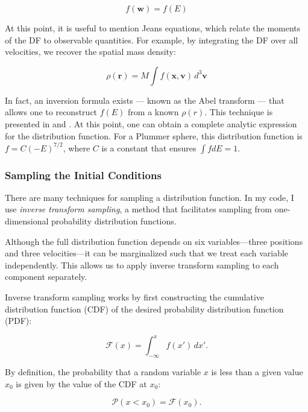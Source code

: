         \[
        f(\mathbf{w}) = f(E)
        \]

        At this point, it is useful to mention Jeans equations, which relate the moments of the DF to observable quantities. For example, by integrating the DF over all velocities, we recover the spatial mass density:

        \[
        \rho(\mathbf{r}) = M \int f(\mathbf{x}, \mathbf{v}) \, d^3\mathbf{v}
        \]

        In fact, an inversion formula exists — known as the Abel transform — that allows one to reconstruct \( f(E) \) from a known \( \rho(r) \). This technique is presented in \citet{2008gady.book.....B} and \citet{bovy_inprep}. At this point, one can obtain a complete analytic expression for the distribution function. For a Plummer sphere, this distribution function is $f = C (-E)^{7/2}$, where $C$ is a constant that ensures $\int f dE =1$. 

        \subsubsection{Sampling the Initial Conditions}

            There are many techniques for sampling a distribution function. In my code, I use \textit{inverse transform sampling}, a method that facilitates sampling from one-dimensional probability distribution functions.

            Although the full distribution function depends on six variables—three positions and three velocities—it can be marginalized such that we treat each variable independently. This allows us to apply inverse transform sampling to each component separately.

            Inverse transform sampling works by first constructing the cumulative distribution function (CDF) of the desired probability distribution function (PDF):

            \begin{equation}
                \mathcal{F}(x) = \int_{-\infty}^{x} f(x')\,dx'.
            \end{equation}

            By definition, the probability that a random variable $x$ is less than a given value $x_0$ is given by the value of the CDF at $x_0$:

            \begin{equation}
                \mathcal{P}(x < x_0) = \mathcal{F}(x_0).
            \end{equation}

